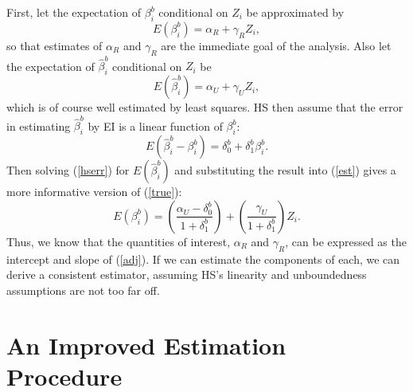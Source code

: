 \documentclass[11pt,titlepage]{article}
\begin{document}
First, let the expectation of $\beta_i^b$ conditional on $Z_i$ be
approximated by
\begin{equation}
  \label{true}
  E(\beta_i^b)=\alpha_R+\gamma_R Z_i,
\end{equation}
so that estimates of $\alpha_R$ and $\gamma_R$ are the immediate goal
of the analysis.  Also let the expectation of $\hat\beta_i^b$
conditional on $Z_i$ be
\begin{equation}
  \label{est}
  E(\hat\beta_i^b)=\alpha_U+\gamma_U Z_i,
\end{equation}
which is of course well estimated by least squares.  HS then assume
that the error in estimating $\hat\beta_i^b$ by EI is a linear
function of $\beta_i^b$:
\begin{equation}
  \label{hserr}
  E(\hat\beta_i^b - \beta_i^b) = \delta_0^b + \delta_1^b\beta_i^b.
\end{equation}
Then solving (\ref{hserr}) for $E(\hat\beta_i^b)$ and substituting the
result into (\ref{est}) gives a more informative version of (\ref{true}):
\begin{equation}
  \label{adj}
  E(\beta_i^b) = \left(\frac{\alpha_U-\delta_0^b}{1+\delta_1^b}\right)
  + \left(\frac{\gamma_U}{1+\delta_1^b}\right)Z_i.
\end{equation}
Thus, we know that the quantities of interest, $\alpha_R$ and
$\gamma_R$, can be expressed as the intercept and slope of
(\ref{adj}).  If we can estimate the components of each, we can derive
a consistent estimator, assuming HS's linearity and unboundedness
assumptions are not too far off.

\section{An Improved Estimation Procedure}
\end{document}
